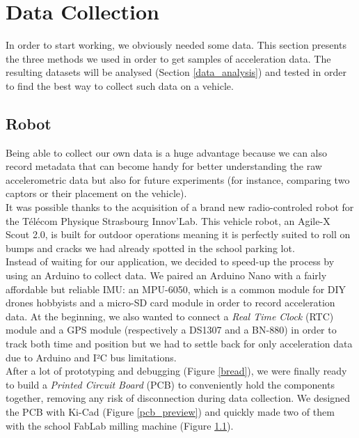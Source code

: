 \section{Data Collection}
\label{data_collection}

In order to start working, we obviously needed some data. This section presents the three methods we used in order to get samples of acceleration data. The resulting datasets will be analysed (Section \ref{data_analysis}) and tested in order to find the best way to collect such data on a vehicle.

\subsection{Robot}
Being able to collect our own data is a huge advantage because we can also record metadata that can become handy for better understanding the raw accelerometric data but also for future experiments (for instance, comparing two captors or their placement on the vehicle).\\

It was possible thanks to the acquisition of a brand new radio-controled robot for the Télécom Physique Strasbourg Innov'Lab. This vehicle robot, an Agile-X Scout 2.0, is built for outdoor operations meaning it is perfectly suited to roll on bumps and cracks we had already spotted in the school parking lot.\\

Instead of waiting for our application, we decided to speed-up the process by using an Arduino to collect data. We paired an Arduino Nano with a fairly affordable but reliable IMU: an MPU-6050, which is a common module for DIY drones hobbyists and a micro-SD card module in order to record acceleration data. At the beginning, we also wanted to connect a \textit{Real Time Clock} (RTC) module and a GPS module (respectively a DS1307 and a BN-880) in order to track both time and position but we had to settle back for only acceleration data due to Arduino and I²C bus limitations.\\

After a lot of prototyping and debugging (Figure \ref{bread}), we were finally ready to build a \textit{Printed Circuit Board} (PCB) to conveniently hold the components together, removing any risk of disconnection during data collection. We designed the PCB with Ki-Cad (Figure \ref{pcb_preview}) and quickly made two of them with the school FabLab milling machine (Figure \ref{}).\\

